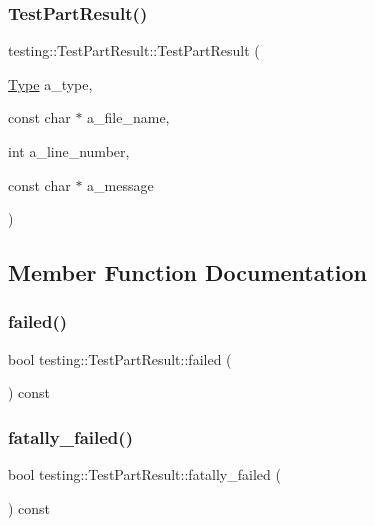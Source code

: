 \subsubsection{\texorpdfstring{Test\+Part\+Result()}{TestPartResult()}}
{\footnotesize\ttfamily testing\+::\+Test\+Part\+Result\+::\+Test\+Part\+Result (\begin{DoxyParamCaption}\item[{\hyperlink{classtesting_1_1_test_part_result_a65ae656b33fdfdfffaf34858778a52d5}{Type}}]{a\+\_\+type,  }\item[{const char $\ast$}]{a\+\_\+file\+\_\+name,  }\item[{int}]{a\+\_\+line\+\_\+number,  }\item[{const char $\ast$}]{a\+\_\+message }\end{DoxyParamCaption})\hspace{0.3cm}{\ttfamily [inline]}}



\subsection{Member Function Documentation}
\mbox{\label{classtesting_1_1_test_part_result_aa04b377c3e7ed57d39e882df5561ac90}} 
\subsubsection{\texorpdfstring{failed()}{failed()}}
{\footnotesize\ttfamily bool testing\+::\+Test\+Part\+Result\+::failed (\begin{DoxyParamCaption}{ }\end{DoxyParamCaption}) const\hspace{0.3cm}{\ttfamily [inline]}}

\mbox{\label{classtesting_1_1_test_part_result_a77db157eff9531c3c00c2420502f9a89}} 
\subsubsection{\texorpdfstring{fatally\+\_\+failed()}{fatally\_failed()}}
{\footnotesize\ttfamily bool testing\+::\+Test\+Part\+Result\+::fatally\+\_\+failed (\begin{DoxyParamCaption}{ }\end{DoxyParamCaption}) const\hspace{0.3cm}{\ttfamily [inline]}}

